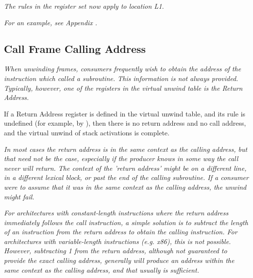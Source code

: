 \textit{The rules in the register set now apply to location L1.}

\textit{For an example, see 
Appendix .}



\subsection{Call Frame Calling Address}
\label{chap:callframecallingaddress}

\textit{When unwinding frames, consumers frequently wish to obtain the
address of the instruction which called a subroutine. This
information is not always provided. Typically, however,
one of the registers in the virtual unwind table is the
Return Address.}

If a Return Address register is defined in the virtual
unwind table, and its rule is undefined (for example, by
), then there is no return address and no
call address, and the virtual unwind of stack activations
is complete.

\textit{In most cases the return address is in the same context as the
calling address, but that need not be the case, especially if
the producer knows in some way the call never will return. The
context of the 'return address' might be on a different line,
in a different lexical block, or past the end of the calling
subroutine. If a consumer were to assume that it was in the
same context as the calling address, the unwind might fail.}

\textit{For architectures with constant-length instructions where
the return address immediately follows the call instruction,
a simple solution is to subtract the length of an instruction
from the return address to obtain the calling instruction. For
architectures with variable-length instructions (e.g.  x86),
this is not possible. However, subtracting 1 from the return
address, although not guaranteed to provide the exact calling
address, generally will produce an address within the same
context as the calling address, and that usually is sufficient.}



